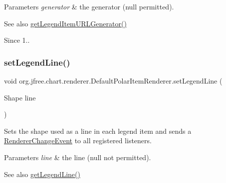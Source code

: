 \begin{DoxyParams}{Parameters}
{\em generator} & the generator ({\ttfamily null} permitted).\\
\hline
\end{DoxyParams}
\begin{DoxySeeAlso}{See also}
\mbox{\hyperlink{classorg_1_1jfree_1_1chart_1_1renderer_1_1_default_polar_item_renderer_a11bfd005168c27b4d10395b74c7ca441}{get\+Legend\+Item\+U\+R\+L\+Generator()}} 
\end{DoxySeeAlso}
\begin{DoxySince}{Since}
1.. 
\end{DoxySince}
\mbox{\label{classorg_1_1jfree_1_1chart_1_1renderer_1_1_default_polar_item_renderer_ac2ba04156bf456553d124b59febe8919}} 
\subsubsection{\texorpdfstring{set\+Legend\+Line()}{setLegendLine()}}
{\footnotesize\ttfamily void org.\+jfree.\+chart.\+renderer.\+Default\+Polar\+Item\+Renderer.\+set\+Legend\+Line (\begin{DoxyParamCaption}\item[{Shape}]{line }\end{DoxyParamCaption})}

Sets the shape used as a line in each legend item and sends a \mbox{\hyperlink{}{Renderer\+Change\+Event}} to all registered listeners.


\begin{DoxyParams}{Parameters}
{\em line} & the line ({\ttfamily null} not permitted).\\
\hline
\end{DoxyParams}
\begin{DoxySeeAlso}{See also}
\mbox{\hyperlink{classorg_1_1jfree_1_1chart_1_1renderer_1_1_default_polar_item_renderer_a5b323bb3c4df0c784bbffa591b3d8d99}{get\+Legend\+Line()}} 
\end{DoxySeeAlso}
\mbox{\label{classorg_1_1jfree_1_1chart_1_1renderer_1_1_default_polar_item_renderer_ad296a32b8f8f8c0bd6d460204781eaea}} 
